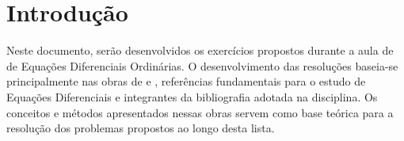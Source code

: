 \section{Introdução}

Neste documento, serão desenvolvidos os exercícios propostos durante a aula de
de Equações Diferenciais Ordinárias. O desenvolvimento das resoluções baseia-se
principalmente nas obras de \citeauthor{zill2001equacoes}
\cite{zill2001equacoes} e \citeauthor{boyce2015equacoes}
\cite{boyce2015equacoes}, referências fundamentais para o estudo de Equações
Diferenciais e integrantes da bibliografia adotada na disciplina. Os conceitos
e métodos apresentados nessas obras servem como base teórica para a resolução
dos problemas propostos ao longo desta lista.
